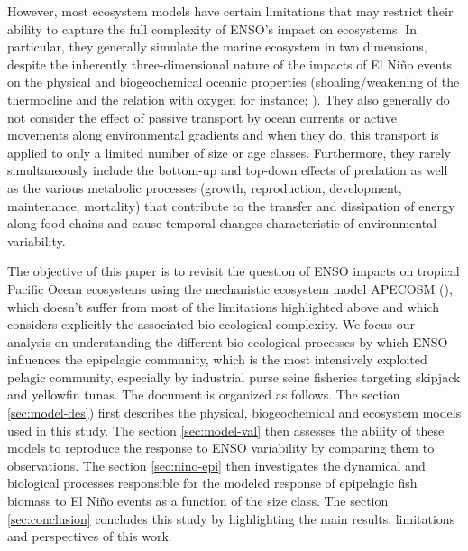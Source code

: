 However, most ecosystem models have certain limitations that may restrict their ability to capture the full complexity of ENSO's impact on ecosystems. In particular, they generally simulate the marine ecosystem in two dimensions, despite the  inherently three-dimensional nature of the impacts of El Niño events on the physical and biogeochemical oceanic properties  (shoaling/weakening of the thermocline and the relation with oxygen for instance; \citealp{leungENSODrivesNearsurface2019}). They also generally do not consider the effect of passive transport by ocean currents or active movements along environmental gradients and when they do, this transport is applied  to only a limited number of size or age classes. Furthermore, they rarely simultaneously include  the bottom-up and top-down effects of predation as well as the various metabolic processes (growth, reproduction, development, maintenance, mortality) that contribute to the transfer and dissipation of energy along food chains and cause temporal changes characteristic of environmental variability. 

The objective of this paper is to revisit the question of ENSO impacts on tropical Pacific Ocean ecosystems using the mechanistic ecosystem model APECOSM (\citealp{mauryOverviewAPECOSMSpatialized2010}), which doesn't suffer from most of the limitations highlighted above and which considers explicitly the associated bio-ecological complexity. We focus our analysis on understanding the different bio-ecological processes by which ENSO influences the epipelagic community, which is  the most intensively exploited pelagic community, especially by industrial purse seine fisheries targeting skipjack and yellowfin tunas. The document is organized as follows. The section \ref{sec:model-des}) first describes the physical, biogeochemical and ecosystem models used in this study. The section \ref{sec:model-val} then assesses the ability of these models to reproduce the response to ENSO variability by comparing them to observations. The section \ref{sec:nino-epi} then investigates the dynamical and biological processes responsible for the modeled response of epipelagic fish biomass to El Niño events as a function of the size class. The section \ref{sec:conclusion} concludes this study by highlighting the main results, limitations and perspectives of this work.

